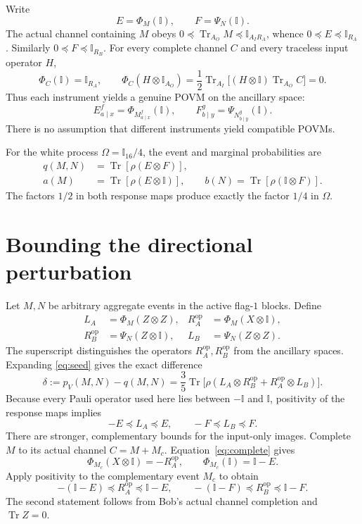 \documentclass[11pt,letterpaper]{article}
\theoremstyle{remark}\newtheorem{remark}[theorem]{Remark}
\newcommand{\Tr}{\operatorname{Tr}}
\newcommand{\I}{\mathbb I}
\begin{document}
Write
\begin{equation}\label{eq:effects}
 E=\Phi_M(\I),\qquad F=\Psi_N(\I).
\end{equation}
The actual channel containing $M$ obeys
$0\preceq\Tr_{A_O}M\preceq\I_{A_I R_A}$, whence
$0\preceq E\preceq\I_{R_A}$. Similarly $0\preceq F\preceq\I_{R_B}$.
For every complete channel $C$ and every traceless input operator $H$,
\begin{equation}\label{eq:complete}
 \Phi_C(\I)=\I_{R_A},\qquad
 \Phi_C(H\otimes\I_{A_O})
 =\frac12\Tr_{A_I}\bigl[(H\otimes\I)\Tr_{A_O}C\bigr]=0.
\end{equation}
Thus each instrument yields a genuine POVM on the ancillary space:
\[
 E^f_{a\mid x}=\Phi_{M^f_{a\mid x}}(\I),\qquad
 F^g_{b\mid y}=\Psi_{N^g_{b\mid y}}(\I).
\]
There is no assumption that different instruments yield compatible POVMs.

For the white process $\Omega=\I_{16}/4$, the event and marginal probabilities are
\begin{align}
 q(M,N)&=\Tr[\rho(E\otimes F)],\label{eq:q}\\
 a(M)&=\Tr[\rho(E\otimes\I)],\qquad
 b(N)=\Tr[\rho(\I\otimes F)].\label{eq:ab}
\end{align}
The factors $1/2$ in both response maps produce exactly the factor $1/4$ in $\Omega$.

\section{Bounding the directional perturbation}\label{sec:perturbation}

Let $M,N$ be arbitrary aggregate events in the active flag-$1$ blocks. Define
\begin{align*}
 L_A&=\Phi_M(Z\otimes Z),& R_A^{\mathrm{op}}&=\Phi_M(X\otimes\I),\\
 R_B^{\mathrm{op}}&=\Psi_N(Z\otimes\I),& L_B&=\Psi_N(Z\otimes Z).
\end{align*}
The superscript distinguishes the operators $R_A^{\mathrm{op}},R_B^{\mathrm{op}}$ from the ancillary spaces. Expanding \eqref{eq:seed} gives the exact difference
\begin{equation}\label{eq:delta}
 \delta:=p_V(M,N)-q(M,N)
 =\frac35\Tr\bigl[\rho(L_A\otimes R_B^{\mathrm{op}}
                     +R_A^{\mathrm{op}}\otimes L_B)\bigr].
\end{equation}
Because every Pauli operator used here lies between $-\I$ and $\I$, positivity of the response maps implies
\begin{equation}\label{eq:localbounds}
 -E\preceq L_A\preceq E,\qquad -F\preceq L_B\preceq F.
\end{equation}
There are stronger, complementary bounds for the input-only images. Complete $M$ to its actual channel $C=M+M_c$. Equation~\eqref{eq:complete} gives
\[
 \Phi_{M_c}(X\otimes\I)=-R_A^{\mathrm{op}},\qquad
 \Phi_{M_c}(\I)=\I-E.
\]
Apply positivity to the complementary event $M_c$ to obtain
\begin{equation}\label{eq:complementbounds}
 -(\I-E)\preceq R_A^{\mathrm{op}}\preceq\I-E,
 \qquad
 -(\I-F)\preceq R_B^{\mathrm{op}}\preceq\I-F.
\end{equation}
The second statement follows from Bob's actual channel completion and $\Tr Z=0$.
\end{document}
